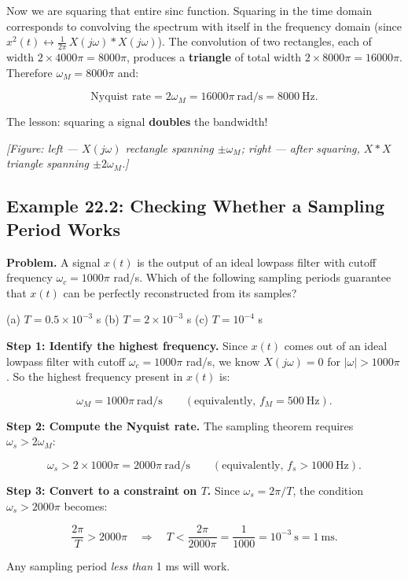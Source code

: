 \documentclass[11pt]{article}
\begin{document}
Now we are squaring that entire sinc function. Squaring in the time domain corresponds to convolving the spectrum with itself in the frequency domain (since $x^2(t) \leftrightarrow \frac{1}{2\pi}\,X(j\omega) * X(j\omega)$). The convolution of two rectangles, each of width $2 \times 4000\pi = 8000\pi$, produces a \textbf{triangle} of total width $2 \times 8000\pi = 16000\pi$. Therefore $\omega_M = 8000\pi$ and:

\[\text{Nyquist rate} = 2\omega_M = 16000\pi\ \text{rad/s} = 8000\ \text{Hz}.\]

The lesson: squaring a signal \textbf{doubles} the bandwidth!

\textit{[Figure: left — $X(j\omega)$ rectangle spanning $\pm\omega_M$; right — after squaring, $X * X$ triangle spanning $\pm 2\omega_M$.]}

\subsection*{Example 22.2: Checking Whether a Sampling Period Works}

\textbf{Problem.} A signal $x(t)$ is the output of an ideal lowpass filter with cutoff frequency $\omega_c = 1000\pi$ rad/s. Which of the following sampling periods guarantee that $x(t)$ can be perfectly reconstructed from its samples?

(a) $T = 0.5 \times 10^{-3}$ s
(b) $T = 2 \times 10^{-3}$ s
(c) $T = 10^{-4}$ s

\textbf{Step 1: Identify the highest frequency.}
Since $x(t)$ comes out of an ideal lowpass filter with cutoff $\omega_c = 1000\pi$ rad/s, we know $X(j\omega) = 0$ for $|\omega| > 1000\pi$. So the highest frequency present in $x(t)$ is:

\[\omega_M = 1000\pi\ \text{rad/s} \qquad (\text{equivalently, } f_M = 500\ \text{Hz}).\]

\textbf{Step 2: Compute the Nyquist rate.}
The sampling theorem requires $\omega_s > 2\omega_M$:

\[\omega_s > 2 \times 1000\pi = 2000\pi\ \text{rad/s} \qquad (\text{equivalently, } f_s > 1000\ \text{Hz}).\]

\textbf{Step 3: Convert to a constraint on $T$.}
Since $\omega_s = 2\pi/T$, the condition $\omega_s > 2000\pi$ becomes:

\[\frac{2\pi}{T} > 2000\pi \quad\Longrightarrow\quad T < \frac{2\pi}{2000\pi} = \frac{1}{1000} = 10^{-3}\ \text{s} = 1\ \text{ms}.\]

Any sampling period \textit{less than} 1 ms will work.
\end{document}
